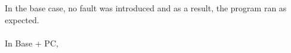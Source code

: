 In the base case, no fault was introduced and as a result, the program ran as expected.\\\\
%
In Base + PC, 
